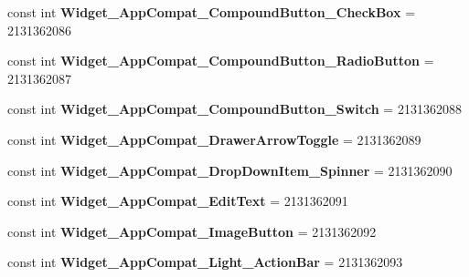 \begin{DoxyCompactItemize}
const int {\bfseries Widget\+\_\+\+App\+Compat\+\_\+\+Compound\+Button\+\_\+\+Check\+Box} = 2131362086
\item 
\mbox{\label{class_pinned_app_1_1_droid_1_1_resource_1_1_style_a125fb3f0a46679726c32c0685706c87c}} 
const int {\bfseries Widget\+\_\+\+App\+Compat\+\_\+\+Compound\+Button\+\_\+\+Radio\+Button} = 2131362087
\item 
\mbox{\label{class_pinned_app_1_1_droid_1_1_resource_1_1_style_a7647af8d31536c478e2212f51a0a3469}} 
const int {\bfseries Widget\+\_\+\+App\+Compat\+\_\+\+Compound\+Button\+\_\+\+Switch} = 2131362088
\item 
\mbox{\label{class_pinned_app_1_1_droid_1_1_resource_1_1_style_ab1c430da2645b3dc97757133aa396585}} 
const int {\bfseries Widget\+\_\+\+App\+Compat\+\_\+\+Drawer\+Arrow\+Toggle} = 2131362089
\item 
\mbox{\label{class_pinned_app_1_1_droid_1_1_resource_1_1_style_afcb58e6d324e9a5d97a54b46ce194b88}} 
const int {\bfseries Widget\+\_\+\+App\+Compat\+\_\+\+Drop\+Down\+Item\+\_\+\+Spinner} = 2131362090
\item 
\mbox{\label{class_pinned_app_1_1_droid_1_1_resource_1_1_style_a0b1d5e962a2aaaf0f52b28ba6bf66189}} 
const int {\bfseries Widget\+\_\+\+App\+Compat\+\_\+\+Edit\+Text} = 2131362091
\item 
\mbox{\label{class_pinned_app_1_1_droid_1_1_resource_1_1_style_a3d0fdfffabf231b8138d66df96bdc821}} 
const int {\bfseries Widget\+\_\+\+App\+Compat\+\_\+\+Image\+Button} = 2131362092
\item 
\mbox{\label{class_pinned_app_1_1_droid_1_1_resource_1_1_style_a21455513fb29a845b5ef408c6da52aed}} 
const int {\bfseries Widget\+\_\+\+App\+Compat\+\_\+\+Light\+\_\+\+Action\+Bar} = 2131362093
\item 
\mbox{\label{class_pinned_app_1_1_droid_1_1_resource_1_1_style_a58a564a1b536552cd3879d52287d71ab}} 

\end{DoxyCompactItemize}
